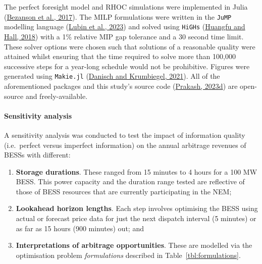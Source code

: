 \documentclass[12pt,a4paper,]{report}
\providecommand{\tightlist}{%
  \setlength{\itemsep}{0pt}\setlength{\parskip}{0pt}}
\begin{document}
The perfect foresight model and RHOC simulations were implemented in
Julia (\protect\hyperlink{ref-bezansonJuliaFreshApproach2017}{Bezanson
et al., 2017}). The MILP formulations were written in the \texttt{JuMP}
modelling language
(\protect\hyperlink{ref-lubinJuMPRecentImprovements2023}{Lubin et al.,
2023}) and solved using \texttt{HiGHs}
(\protect\hyperlink{ref-huangfuParallelizingDualRevised2018}{Huangfu and
Hall, 2018}) with a 1\% relative MIP gap tolerance and a 30 second time
limit. These solver options were chosen such that solutions of a
reasonable quality were attained whilst ensuring that the time required
to solve more than 100,000 successive steps for a year-long schedule
would not be prohibitive. Figures were generated using \texttt{Makie.jl}
(\protect\hyperlink{ref-danischMakieJlFlexible2021}{Danisch and
Krumbiegel, 2021}). All of the aforementioned packages and this study's
source code
(\protect\hyperlink{ref-prakashNEMStorageUnderUncertainty2023}{Prakash,
2023d}) are open-source and freely-available.

\hypertarget{sec:info-case_study-bess_simulations-method-sensitivity_analysis}{%
\paragraph{Sensitivity
analysis}\label{sec:info-case_study-bess_simulations-method-sensitivity_analysis}}

A sensitivity analysis was conducted to test the impact of information
quality (i.e.~perfect versus imperfect information) on the annual
arbitrage revenues of BESSs with different:

\begin{enumerate}
\def\labelenumi{\arabic{enumi}.}
\tightlist
\item
  \textbf{Storage durations}. These ranged from 15 minutes to 4 hours
  for a 100 MW BESS. This power capacity and the duration range tested
  are reflective of those of BESS resources that are currently
  participating in the NEM;
\item
  \textbf{Lookahead horizon lengths}. Each step involves optimising the
  BESS using actual or forecast price data for just the next dispatch
  interval (5 minutes) or as far as 15 hours (900 minutes) out; and
\item
  \textbf{Interpretations of arbitrage opportunities}. These are
  modelled via the optimisation problem \emph{formulations} described in
  Table~\ref{tbl:formulations}.
\end{enumerate}
\end{document}
